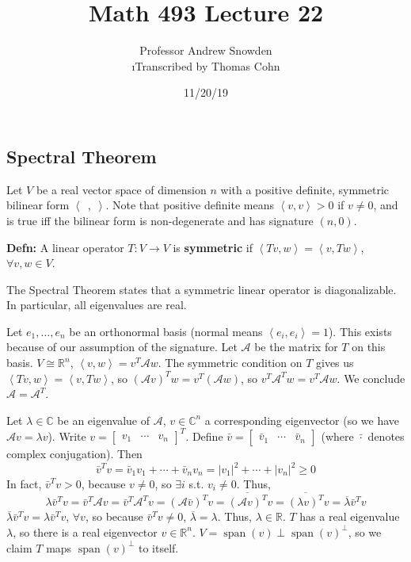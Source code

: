 \documentclass[10pt,letterpaper]{article}
\author{Professor Andrew Snowden\\ \small\i{Transcribed by Thomas Cohn}}
\title{Math 493 Lecture 22}
\date{11/20/19} %
\newcommand{\n}{\hfill\break}
\newcommand{\hangblock}[2]{\par\noindent\settowidth{\hangindent}{\textbf{#1: }}\textbf{#1: }\!\!\!#2}
\newcommand{\defn}[1]{\hangblock{Defn}{#1}}
\newcommand{\reals}{\mathbb{R}}
\newcommand{\R}{\reals}
\newcommand{\complex}{\mathbb{C}}
\newcommand{\C}{\complex}
\newcommand{\abs}[1]{\left|#1\right|}
\newcommand{\conj}[1]{\overline{#1}}
\newcommand{\tpose}{^{T}\!}
\newcommand{\iprod}[1]{\left<#1\right>}
\newcommand{\giprod}{\iprod{\;\,,\;}}
\DeclareMathOperator{\vspan}{span}
\newcommand{\smallBMatrix}[1]{\brack{\begin{smallmatrix}#1\end{smallmatrix}}}
\newcommand{\st}{s.t.}
\renewcommand{\brack}[1]{\left[#1\right]}
\begin{document}
\maketitle
\setlength\RaggedRightParindent{\parindent}
\RaggedRight

\subsection*{Spectral Theorem}

\par\noindent
Let $V$ be a real vector space of dimension $n$ with a positive definite, symmetric bilinear form $\giprod$. Note that positive definite means $\iprod{v,v}>0$ if $v\ne{}0$, and is true iff the bilinear form is non-degenerate and has signature $(n,0)$.\n

\defn{
	A linear operator $T:V\to{}V$ is \textbf{symmetric} if $\iprod{Tv,w}=\iprod{v,Tw}$, $\forall{}v,w\in{}V$.\n
}

\par\noindent
The Spectral Theorem states that a symmetric linear operator is diagonalizable. In particular, all eigenvalues are real.\n

\par\noindent
Let $e_{1},\ldots,e_{n}$ be an orthonormal basis (normal means $\iprod{e_{i},e_{i}}=1$). This exists because of our assumption of the signature. Let $\mathcal{A}$ be the matrix for $T$ on this basis. $V\cong\R^{n}$, $\iprod{v,w}=v\tpose{}\mathcal{A}w$. The symmetric condition on $T$ gives us $\iprod{Tv,w}=\iprod{v,Tw}$, so $(\mathcal{A}v)\tpose{}w=v\tpose(\mathcal{A}w)$, so $v\tpose{}\mathcal{A}\tpose{}w=v\tpose{}\mathcal{A}w$. We conclude $\mathcal{A}=\mathcal{A}\tpose$.\n

\par\noindent
Let $\lambda\in\C$ be an eigenvalue of $\mathcal{A}$, $v\in\C^{n}$ a corresponding eigenvector (so we have $\mathcal{A}v=\lambda{}v$).\n
Write $v=\smallBMatrix{v_{1} & \cdots & v_{n}}\tpose$. Define $\bar v=\smallBMatrix{\bar v_{1} & \cdots & \bar v_{n}}$ (where $\bar \cdot$ denotes complex conjugation). Then
\[
	\bar v\tpose{}v=\bar v_{1}v_{1}+\cdots+\bar v_{n}v_{n}=\abs{v_{1}}^{2}+\cdots+\abs{v_{n}}^{2}\ge{}0
\]
In fact, $\bar v\tpose{}v>0$, because $v\ne{}0$, so $\exists{}i$ \st{} $v_{i}\ne{}0$. Thus,
\[
	\lambda\bar v\tpose{}v=\bar v\tpose\mathcal{A}v=\bar v\tpose\mathcal{A}\tpose{}v=(\mathcal{A}\bar v)\tpose{}v=\conj{(\mathcal{A}v)\tpose}v=\conj{(\lambda{}v)\tpose}v=\conj{\lambda}\bar v\tpose{}v
\]
$\conj{\lambda}\bar v\tpose{}v=\lambda\bar v\tpose{}v$, $\forall{}v$, so because $\bar v\tpose{}v\ne{}0$, $\conj{\lambda}=\lambda$. Thus, $\lambda\in\R$. $T$ has a real eigenvalue $\lambda$, so there is a real eigenvector $v\in\R^{n}$. $V=\vspan(v)\perp\vspan(v)^{\perp}$, so we claim $T$ maps $\vspan(v)^{\perp}$ to itself.\n
\end{document}
